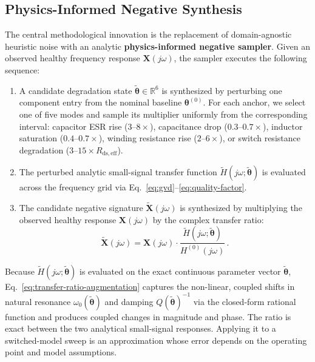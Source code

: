 \documentclass[11pt,a4paper]{article}
\begin{document}
\subsection{Physics-Informed Negative Synthesis}
\label{sec:physics-negatives}
The central methodological innovation is the replacement of domain-agnostic heuristic noise with an analytic \textbf{physics-informed negative sampler}. Given an observed healthy frequency response $\mathbf{X}(j\omega)$, the sampler executes the following sequence:
\begin{enumerate}
    \item A candidate degradation state $\tilde{\boldsymbol{\theta}} \in \mathbb{R}^6$ is synthesized by perturbing one component entry from the nominal baseline $\boldsymbol{\theta}^{(0)}$. For each anchor, we select one of five modes and sample its multiplier uniformly from the corresponding interval: capacitor ESR rise ($3$--$8\times$), capacitance drop ($0.3$--$0.7\times$), inductor saturation ($0.4$--$0.7\times$), winding resistance rise ($2$--$6\times$), or switch resistance degradation ($3$--$15\times R_{\mathrm{ds},\mathrm{eff}}$).
    \item The perturbed analytic small-signal transfer function $\tilde{H}(j\omega; \tilde{\boldsymbol{\theta}})$ is evaluated across the frequency grid via Eq.~\eqref{eq:gvd}--\eqref{eq:quality-factor}.
    \item The candidate negative signature $\tilde{\mathbf{X}}(j\omega)$ is synthesized by multiplying the observed healthy response $\mathbf{X}(j\omega)$ by the complex transfer ratio:
    \begin{equation}
    \tilde{\mathbf{X}}(j\omega) = \mathbf{X}(j\omega) \cdot \frac{\tilde{H}(j\omega; \tilde{\boldsymbol{\theta}})}{H^{(0)}(j\omega)}\,.
    \label{eq:transfer-ratio-augmentation}
    \end{equation}
\end{enumerate}
Because $\tilde{H}(j\omega; \tilde{\boldsymbol{\theta}})$ is evaluated on the exact continuous parameter vector $\tilde{\boldsymbol{\theta}}$, Eq.~\eqref{eq:transfer-ratio-augmentation} captures the non-linear, coupled shifts in natural resonance $\omega_0(\tilde{\boldsymbol{\theta}})$ and damping $Q(\tilde{\boldsymbol{\theta}})^{-1}$ via the closed-form rational function and produces coupled changes in magnitude and phase. The ratio is exact between the two analytical small-signal responses. Applying it to a switched-model sweep is an approximation whose error depends on the operating point and model assumptions.
\end{document}
